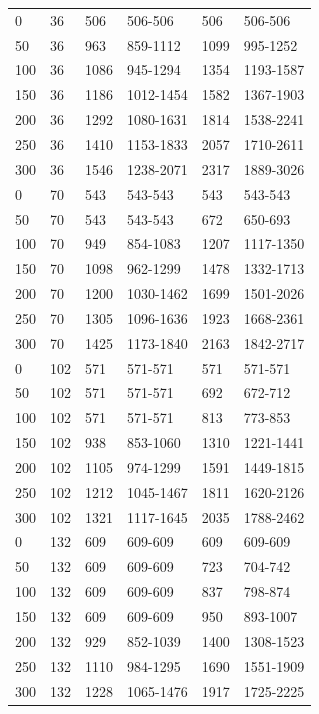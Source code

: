 \begin{table}[H]
{\begin{tabular}{@{\extracolsep{2 pt}}llllll@{}}
			\hline
			0 & 36 & 506 & 506-506 & 506 & 506-506 \\ 
			50 & 36 & 963 & 859-1112 & 1099 & 995-1252 \\ 
			100 & 36 & 1086 & 945-1294 & 1354 & 1193-1587 \\ 
			150 & 36 & 1186 & 1012-1454 & 1582 & 1367-1903 \\ 
			200 & 36 & 1292 & 1080-1631 & 1814 & 1538-2241 \\ 
			250 & 36 & 1410 & 1153-1833 & 2057 & 1710-2611 \\ 
			300 & 36 & 1546 & 1238-2071 & 2317 & 1889-3026 \\ 
			\hline
			0 & 70 & 543 & 543-543 & 543 & 543-543 \\ 
			50 & 70 & 543 & 543-543 & 672 & 650-693 \\ 
			100 & 70 & 949 & 854-1083 & 1207 & 1117-1350 \\ 
			150 & 70 & 1098 & 962-1299 & 1478 & 1332-1713 \\ 
			200 & 70 & 1200 & 1030-1462 & 1699 & 1501-2026 \\ 
			250 & 70 & 1305 & 1096-1636 & 1923 & 1668-2361 \\ 
			300 & 70 & 1425 & 1173-1840 & 2163 & 1842-2717 \\ 
			\hline
			0 & 102 & 571 & 571-571 & 571 & 571-571 \\ 
			50 & 102 & 571 & 571-571 & 692 & 672-712 \\ 
			100 & 102 & 571 & 571-571 & 813 & 773-853 \\ 
			150 & 102 & 938 & 853-1060 & 1310 & 1221-1441 \\ 
			200 & 102 & 1105 & 974-1299 & 1591 & 1449-1815 \\ 
			250 & 102 & 1212 & 1045-1467 & 1811 & 1620-2126 \\ 
			300 & 102 & 1321 & 1117-1645 & 2035 & 1788-2462 \\ 
			\hline
			0 & 132 & 609 & 609-609 & 609 & 609-609 \\ 
			50 & 132 & 609 & 609-609 & 723 & 704-742 \\ 
			100 & 132 & 609 & 609-609 & 837 & 798-874 \\ 
			150 & 132 & 609 & 609-609 & 950 & 893-1007 \\ 
			200 & 132 & 929 & 852-1039 & 1400 & 1308-1523 \\ 
			250 & 132 & 1110 & 984-1295 & 1690 & 1551-1909 \\ 
			300 & 132 & 1228 & 1065-1476 & 1917 & 1725-2225 \\ 

\end{tabular}}
\end{table}
